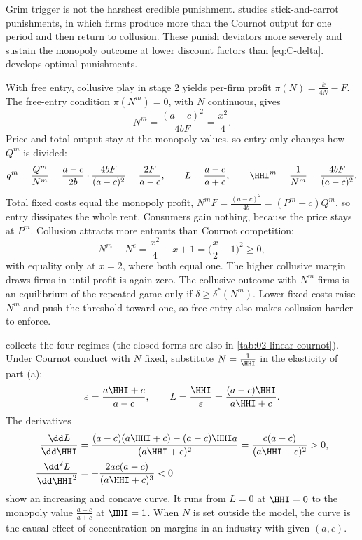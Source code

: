 \begin{remark}
Grim trigger is not the harshest credible punishment. \citet{Abreu1986} studies stick-and-carrot
punishments, in which firms produce more than the Cournot output for one period and then return to
collusion. These punish deviators more severely and sustain the monopoly outcome at lower discount factors
than \eqref{eq:C-delta}.  develops optimal punishments.
\end{remark}

With free entry, collusive play in stage 2 yields per-firm profit $\pi(N) = \frac{k}{4N} - F$. The free-entry
condition $\pi(N^m) = 0$, with $N$ continuous, gives
\begin{equation}\label{eq:C-Nm}
N^m = \frac{(a - c)^2}{4bF} = \frac{x^2}{4}.
\end{equation}
Price and total output stay at the monopoly values, so entry only changes how $Q^m$ is divided:
\begin{equation*}
q^m = \frac{Q^m}{N^m} = \frac{a - c}{2b}\cdot\frac{4bF}{(a - c)^2} = \frac{2F}{a - c}, \qquad
L = \frac{a - c}{a + c}, \qquad \HHI^m = \frac{1}{N^m} = \frac{4bF}{(a - c)^2}.
\end{equation*}
Total fixed costs equal the monopoly profit, $N^mF = \frac{(a - c)^2}{4b} = (P^m - c)Q^m$, so entry dissipates
the whole rent. Consumers gain nothing, because the price stays at $P^m$. Collusion attracts more entrants
than Cournot competition:
\begin{equation}\label{eq:C-Nm-Ne}
N^m - N^e = \frac{x^2}{4} - x + 1 = \Big(\frac{x}{2} - 1\Big)^2 \ge 0,
\end{equation}
with equality only at $x = 2$, where both equal one. The higher collusive margin draws firms in until profit is
again zero. The collusive outcome with $N^m$ firms is an equilibrium of the repeated game only if $\delta \ge
\delta^*(N^m)$. Lower fixed costs raise $N^m$ and push the threshold toward one, so free entry also
makes collusion harder to enforce.

 collects the four regimes (the closed forms are also in
\cref{tab:02-linear-cournot}). Under Cournot conduct with $N$ fixed, substitute $N = \frac{1}{\HHI}$ in
the elasticity of part (a):
\begin{equation}\label{eq:C-LH-curve}
\varepsilon = \frac{a\HHI + c}{a - c}, \qquad L = \frac{\HHI}{\varepsilon} = \frac{(a - c)\HHI}{a\HHI + c}.
\end{equation}
The derivatives
\begin{align*}
\frac{\dd L}{\dd\HHI} &= \frac{(a - c)(a\HHI + c) - (a - c)\HHI a}{(a\HHI + c)^2} = \frac{c(a - c)}{(a\HHI + c)^2} > 0,\\
\frac{\dd^2 L}{\dd\HHI^2} &= -\frac{2ac(a - c)}{(a\HHI + c)^3} < 0
\end{align*}
show an increasing and concave curve. It runs from $L = 0$ at $\HHI = 0$ to the monopoly value
$\frac{a - c}{a + c}$ at $\HHI = 1$. When $N$ is set outside the model, the curve is the causal effect of
concentration on margins in an industry with given $(a, c)$.


